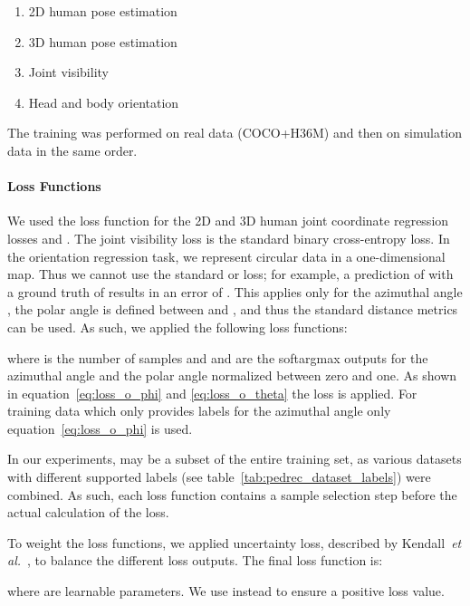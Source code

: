\documentclass[a4paper, 10pt, conference]{ieeeconf}
\begin{document}
\begin{enumerate}
  \item 2D human pose estimation
  \item 3D human pose estimation
  \item Joint visibility
  \item Head and body orientation
\end{enumerate}

The training was performed on real data (COCO+H36M) and then on simulation data in the same order. 

\paragraph{Loss Functions}
\label{sec:pedrec:loss_functions}
We used the  loss function for the 2D and 3D human joint coordinate regression losses  and . The joint visibility loss  is the standard binary cross-entropy loss. In the orientation regression task, we represent circular data in a one-dimensional map. Thus we cannot use the standard  or  loss; for example, a prediction of  with a ground truth of  results in an error of . This applies only for the azimuthal angle , the polar angle  is defined between  and , and thus the standard distance metrics can be used. As such, we applied the following loss functions:



where  is the number of samples and  and  are the softargmax outputs for the azimuthal angle  and the polar angle  normalized between zero and one. As shown in equation~\ref{eq:loss_o_phi} and \ref{eq:loss_o_theta} the  loss is applied. For training data which only provides labels for the azimuthal angle  only equation~\ref{eq:loss_o_phi} is used. 

In our experiments,  may be a subset of the entire training set, as various datasets with different supported labels (see table~\ref{tab:pedrec_dataset_labels}) were combined. As such, each loss function contains a sample selection step before the actual calculation of the loss.

To weight the loss functions, we applied uncertainty loss, described by Kendall~\textit{et al.}~\cite{kendallMultitaskLearningUsing2018}, to balance the different loss outputs. The final loss function is:



where  are learnable parameters. We use  instead  to ensure a positive loss value.
\end{document}
